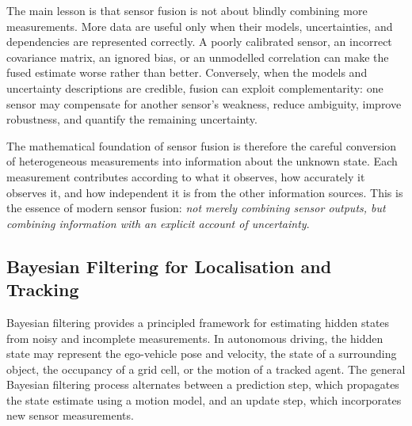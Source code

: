 \documentclass{ieeeaccess}
\newcommand{\deleted}[1]{\textcolor{red}{\sout{#1}}}
\begin{document}

The main lesson is that sensor fusion is not about blindly combining more measurements. More data are useful only when their models, uncertainties, and dependencies are represented correctly. A poorly calibrated sensor, an incorrect covariance matrix, an ignored bias, or an unmodelled correlation can make the fused estimate worse rather than better. Conversely, when the models and uncertainty descriptions are credible, fusion can exploit complementarity: one sensor may compensate for another sensor's weakness, reduce ambiguity, improve robustness, and quantify the remaining uncertainty.

The mathematical foundation of sensor fusion is therefore the careful conversion of heterogeneous measurements into information about the unknown state. Each measurement contributes according to what it observes, how accurately it observes it, and how independent it is from the other information sources. 
This is the essence of modern sensor fusion: \emph{not merely combining sensor outputs, but combining information with an explicit account of uncertainty}.

%
\subsection{Bayesian Filtering for Localisation and Tracking}
%

Bayesian filtering provides a principled framework for estimating hidden states from noisy and incomplete measurements. In autonomous driving, the hidden state may represent the ego-vehicle pose and velocity, the state of a surrounding object, the occupancy of a grid cell, or the motion of a tracked agent. The general Bayesian filtering process alternates between a prediction step, which propagates the state estimate using a motion model, and an update step, which incorporates new sensor measurements.
\end{document}
